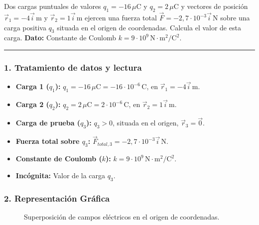 \begin{cajaenunciado}
Dos cargas puntuales de valores $q_{1}=-16\,\mu\text{C}$ y $q_{2}=2\,\mu\text{C}$ y vectores de posición $\vec{r}_{1}=-4\vec{i}\,\text{m}$ y $\vec{r}_{2}=1\vec{i}\,\text{m}$ ejercen una fuerza total $\vec{F}=-2,7\cdot10^{-3}\vec{i}\,\text{N}$ sobre una carga positiva $q_3$ situada en el origen de coordenadas. Calcula el valor de esta carga.
\textbf{Dato:} Constante de Coulomb $k=9\cdot10^{9}\,\text{N}\cdot\text{m}^2/\text{C}^2$.
\end{cajaenunciado}
\hrule

\subsubsection*{1. Tratamiento de datos y lectura}
\begin{itemize}
    \item \textbf{Carga 1 ($q_1$):} $q_1 = -16\,\mu\text{C} = -16 \cdot 10^{-6}\,\text{C}$, en $\vec{r}_1 = -4\vec{i}\,\text{m}$.
    \item \textbf{Carga 2 ($q_2$):} $q_2 = 2\,\mu\text{C} = 2 \cdot 10^{-6}\,\text{C}$, en $\vec{r}_2 = 1\vec{i}\,\text{m}$.
    \item \textbf{Carga de prueba ($q_3$):} $q_3 > 0$, situada en el origen, $\vec{r}_3 = \vec{0}$.
    \item \textbf{Fuerza total sobre $q_3$:} $\vec{F}_{total,3} = -2,7 \cdot 10^{-3}\vec{i}\,\text{N}$.
    \item \textbf{Constante de Coulomb ($k$):} $k = 9 \cdot 10^9\,\text{N}\cdot\text{m}^2/\text{C}^2$.
    \item \textbf{Incógnita:} Valor de la carga $q_3$.
\end{itemize}

\subsubsection*{2. Representación Gráfica}
\begin{figure}[H]
    \centering
    \caption{Superposición de campos eléctricos en el origen de coordenadas.}
\end{figure}

